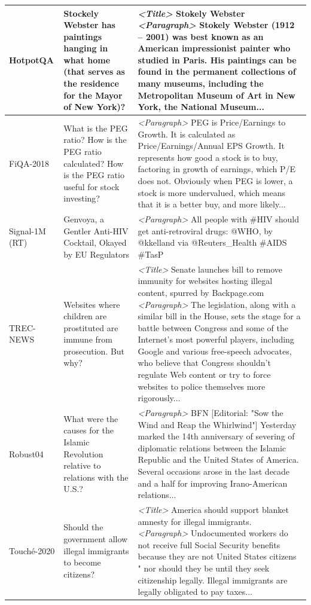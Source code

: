 \documentclass{article}
\begin{document}
\begin{table}[t!]
{\begin{tabular}{l | l | l }
   HotpotQA      & \multicolumn{1}{p{6cm}|}{Stockely Webster has paintings hanging in what home (that serves as the residence for the Mayor of New York)?}& \multicolumn{1}{p{13cm}}{\textit{<Title>} Stokely Webster \textit{<Paragraph>} Stokely Webster (1912 – 2001) was best known as an American impressionist painter who studied in Paris. His paintings can be found in the permanent collections of many museums, including the Metropolitan Museum of Art in New York, the National Museum...} \\ \midrule
    FiQA-2018    & \multicolumn{1}{p{6cm}|}{What is the PEG ratio? How is the PEG ratio calculated? How is the PEG ratio useful for stock investing?} & \multicolumn{1}{p{13cm}}{\textit{<Paragraph>} PEG is Price/Earnings to Growth.  It is calculated as Price/Earnings/Annual EPS Growth.  It represents how good a stock is to buy, factoring in growth of earnings, which P/E does not.  Obviously when PEG is lower, a stock is more undervalued, which means that it is a better buy, and more likely...} \\ \midrule
   Signal-1M (RT) & \multicolumn{1}{p{6cm}|}{Genvoya, a Gentler Anti-HIV Cocktail, Okayed by EU Regulators} & \multicolumn{1}{p{13cm}}{\textit{<Paragraph>} All people with \#HIV should get anti-retroviral drugs: @WHO, by @kkelland  via @Reuters\_Health \#AIDS \#TasP}\\ \midrule
   TREC-NEWS     & \multicolumn{1}{p{6cm}|}{Websites where children are prostituted are immune from prosecution. But why?} & \multicolumn{1}{p{13cm}}{\textit{<Title>} Senate launches bill to remove immunity for websites hosting illegal content, spurred by Backpage.com \textit{<Paragraph>}  The legislation, along with a similar bill in the House, sets the stage for a battle between Congress and some of the Internet’s most powerful players, including Google and various free-speech advocates, who believe that Congress shouldn’t regulate Web content or try to force websites to police themselves more rigorously...}\\ \midrule
   Robust04 & \multicolumn{1}{p{6cm}|}{What were the causes for the Islamic Revolution relative to relations with the U.S.?} & \multicolumn{1}{p{13cm}}{\textit{<Paragraph>}  BFN [Editorial: "Sow the Wind and Reap the Whirlwind"]  Yesterday marked the 14th anniversary of severing of diplomatic relations between the Islamic Republic and the United States of America. Several occasions arose in the last decade and a half for improving Irano-American relations...} \\ \midrule
   Touch\'e-2020 & \multicolumn{1}{p{6cm}|}{Should the government allow illegal immigrants to become citizens?} & \multicolumn{1}{p{13cm}}{\textit{<Title>} America should support blanket amnesty for illegal immigrants. \textit{<Paragraph>} Undocumented workers do not receive full Social Security benefits because they are not United States citizens " nor should they be until they seek citizenship legally. Illegal immigrants are legally obligated to pay taxes...} \\ \midrule 

\end{tabular}}
\end{table}
\end{document}

